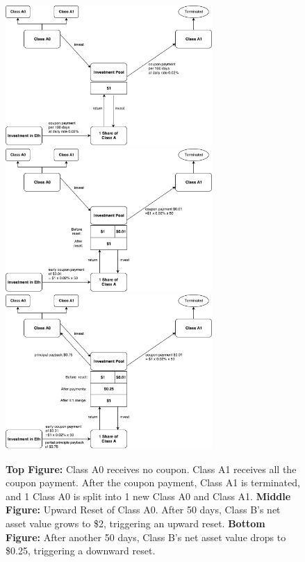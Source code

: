\documentclass[final,pdftex]{ectaart}
\theoremstyle{plain}
\begin{document}
\begin{appendices}
\begin{figure}[p]
\centering
	\includegraphics[width=0.7\textwidth]{A0_periodic}
	\vspace{1em}
	\includegraphics[width=0.7\textwidth]{A0_upward}
	\vspace{1em}
	\includegraphics[width=0.7\textwidth]{A0_downward}
	\caption{{\bf Top Figure:} Class A0 receives no coupon.  Class A1 receives all the coupon payment. After the coupon payment, Class A1 is terminated, and 1 Class A0 is split into 1 new Class A0 and Class A1. {\bf Middle Figure:} Upward Reset of Class A0. After 50 days, Class B's net asset value grows to \$2, triggering an upward reset. {\bf Bottom Figure:} After another 50 days, Class B's net asset value drops to \$0.25, triggering a downward reset. }\label{fig:A0}
\end{figure}


\end{appendices}
\end{document}
